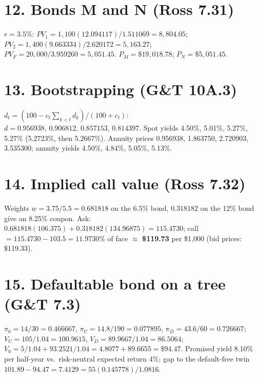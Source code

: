 \documentclass[11pt,a4paper]{article}
\begin{document}
\section*{12. Bonds M and N (Ross 7.31)}
$r=3.5\%$: $PV_1=1{,}100(12.094117)/1.511069=8{,}804.05$; $PV_2=1{,}400(9.663334)/2.620172=5{,}163.27$;
$PV_F=20{,}000/3.959260=5{,}051.45$. $P_M=\$19{,}018.78$; $P_N=\$5{,}051.45$.

\section*{13. Bootstrapping (G\&T 10A.3)}
$d_t=(100-c_t\sum_{k<t}d_k)/(100+c_t)$: $d=0.956938,\,0.906812,\,0.857153,\,0.814397$.
Spot yields 4.50\%, 5.01\%, 5.27\%, 5.27\% (5.2723\%, then 5.2667\%).
Annuity prices 0.956938, 1.863750, 2.720903, 3.535300; annuity yields 4.50\%, 4.84\%, 5.05\%, 5.13\%.

\section*{14. Implied call value (Ross 7.32)}
Weights $w=3.75/5.5=0.681818$ on the 6.5\% bond, $0.318182$ on the 12\% bond give an 8.25\% coupon.
Ask: $0.681818(106.375)+0.318182(134.96875)=115.4730$; call $=115.4730-103.5=11.9730\%$ of face $\approx$ \textbf{\$119.73} per
\$1,000 (bid prices: \$119.33).

\section*{15. Defaultable bond on a tree (G\&T 7.3)}
$\pi_0=14/30=0.466667$, $\pi_U=14.8/190=0.077895$, $\pi_D=43.6/60=0.726667$; $V_U=105/1.04=100.9615$,
$V_D=89.9667/1.04=86.5064$; $V_0=5/1.04+93.2521/1.04=4.8077+89.6655=\$94.47$.
Promised yield 8.10\% per half-year vs.\ risk-neutral expected return 4\%; gap to the default-free twin
$101.89-94.47=7.4129=55(0.145778)/1.0816$.
\end{document}
